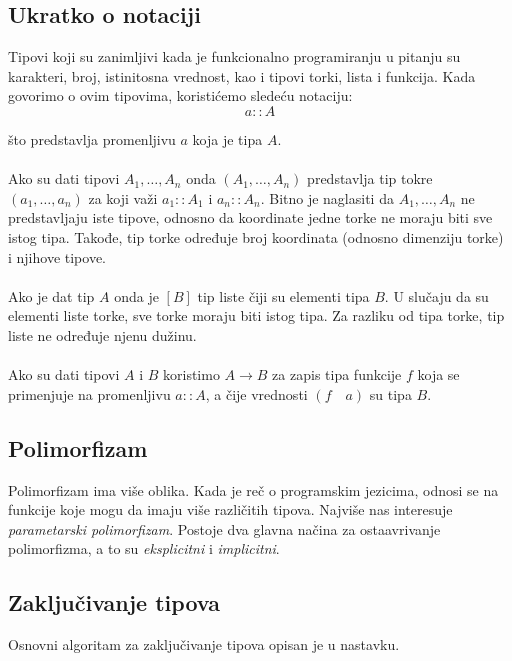\subsection{Ukratko o notaciji}
Tipovi koji su zanimljivi kada je funkcionalno programiranju u pitanju su karakteri, broj, istinitosna vrednost, kao i tipovi torki, lista i funkcija. Kada govorimo o ovim tipovima, koristićemo sledeću notaciju:
$$a::A$$

\noindent što predstavlja promenljivu $a$ koja je tipa $A$. 	
\\
\\ Ako su dati tipovi $A_1, \ldots, A_n$ onda $(A_1, \ldots, A_n)$ predstavlja tip tokre $(a_1, \ldots, a_n)$ za koji važi $a_1::A_1$ i $a_n::A_n$. Bitno je naglasiti da $A_1, \ldots, A_n$ ne predstavljaju iste tipove, odnosno da koordinate jedne torke ne moraju biti sve istog tipa. Takođe, tip torke određuje broj koordinata (odnosno dimenziju torke) i njihove tipove. 
\\
\\ Ako je dat tip $A$ onda je $[B]$ tip liste čiji su elementi tipa $B$. U slučaju da su elementi liste torke, sve torke moraju biti istog tipa. Za razliku od tipa torke, tip liste ne određuje njenu dužinu. 
\\
\\ Ako su dati tipovi $A$ i $B$ koristimo $A \longrightarrow B$ za zapis tipa funkcije $f$ koja se primenjuje na promenljivu $a::A$, a čije vrednosti $(f \quad a)$ su tipa $B$.


\fi 


\subsection{Polimorfizam}

Polimorfizam ima više oblika. Kada je reč o programskim jezicima, odnosi se na funkcije koje mogu da imaju više različitih tipova. Najviše nas interesuje \textit{parametarski polimorfizam}. Postoje dva glavna načina za ostaavrivanje polimorfizma, a to su \textit{eksplicitni} i \textit{implicitni}. %


\subsection{Zaključivanje tipova}

Osnovni algoritam za zaključivanje tipova opisan je u nastavku.

